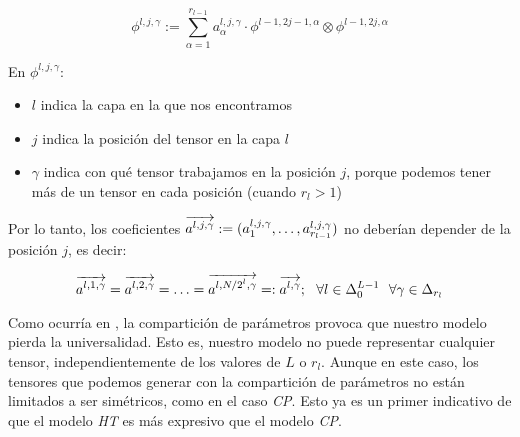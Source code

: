 \begin{equation}
    \phi^{l, j, \gamma} := \sum_{\alpha = 1}^{r_{l-1}} a_{\alpha}^{l, j, \gamma} \cdot \phi^{l-1, 2j-1, \alpha} \otimes \phi^{l-1, 2j, \alpha}
\end{equation}

En $\phi^{l, j, \gamma}$:

\begin{itemize}
    \item $l$ indica la capa en la que nos encontramos
    \item $j$ indica la posición del tensor en la capa $l$
    \item $\gamma$ indica con qué tensor trabajamos en la posición $j$, porque podemos tener más de un tensor en cada posición (cuando $r_l > 1$)
\end{itemize}

Por lo tanto, los coeficientes $\overrightarrow{a^{l, j, \gamma}} := (a^{l, j, \gamma}_1, \ldots, a^{l, j, \gamma}_{r_{l-1}})$ no deberían depender de la posición $j$, es decir:

\begin{equation}
    \overrightarrow{a^{l, 1, \gamma}} = \overrightarrow{a^{l, 2, \gamma}} = \ldots = \overrightarrow{a^{l, N/2^l, \gamma}} =: \overrightarrow{a^{l, \gamma}}; \ \  \forall l \in \Delta_{0}^{L - 1} \ \  \forall \gamma \in \Delta_{r_l}
\end{equation}

Como ocurría en , la compartición de parámetros provoca que nuestro modelo pierda la universalidad. Esto es, nuestro modelo no puede representar cualquier tensor, independientemente de los valores de $L$ o $r_l$. Aunque en este caso, los tensores que podemos generar con la compartición de parámetros no están limitados a ser simétricos, como en el caso \textit{CP}. Esto ya es un primer indicativo de que el modelo \textit{HT} es más expresivo que el modelo \textit{CP}.
